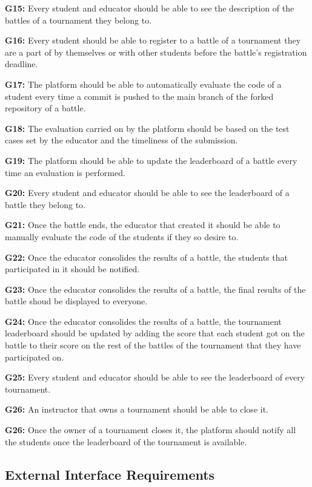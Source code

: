 \documentclass{article}
\begin{document}
    \item \textbf{G15:} Every student and educator should be able to see the description of the battles of a tournament they belong to.
    \item \textbf{G16:} Every student should be able to register to a battle of a tournament they are a part of by themselves or with other students before the battle's registration deadline.
    \item \textbf{G17:} The platform should be able to automatically evaluate the code of a student every time a commit is pushed to the main branch of the forked repository of a battle.
    \item \textbf{G18:} The evaluation carried on by the platform should be based on the test cases set by the educator and the timeliness of the submission.
    \item \textbf{G19:} The platform should be able to update the leaderboard of a battle every time an evaluation is performed. 
    \item \textbf{G20:} Every student and educator should be able to see the leaderboard of a battle they belong to.
    \item \textbf{G21:} Once the battle ends, the educator that created it should be able to manually evaluate the code of the students if they so desire to.
    \item \textbf{G22:} Once the educator consolides the results of a battle, the students that participated in it should be notified.
    \item \textbf{G23:} Once the educator consolides the results of a battle, the final results of the battle shoud be displayed to everyone.
    \item \textbf{G24:} Once the educator consolides the results of a battle, the tournament leaderboard should be updated by adding the score that each student got on the battle to their score on the rest of the battles of the tournament that they have participated on.
    \item \textbf{G25:} Every student and educator should be able to see the leaderboard of every tournament.
    \item \textbf{G26:} An instructor that owns a tournament should be able to close it.
    \item \textbf{G26:} Once the owner of a tournament closes it, the platform should notify all the students once the leaderboard of the tournament is available.
\fi
\subsection{External Interface Requirements}
\end{document}
